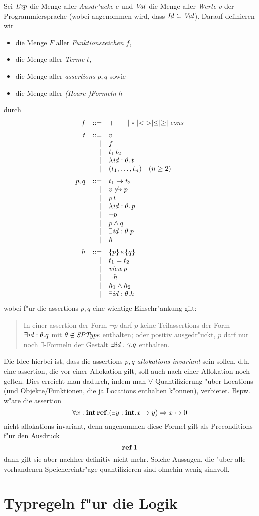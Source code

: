 \documentclass[12pt,a4paper,bigheadings]{scrartcl}
\newcommand{\Sptype}{\name{SPType}}
\renewcommand{\disjoint}[2]{\ensuremath{#2\not\hookrightarrow#1}}
\newcommand{\view}[1]{\ensuremath{\app{\name{view}}{#1}}}
\begin{document}
Sei ${\text{\it Exp\/}}$ die Menge aller {\em Ausdr"ucke} $e$ und ${\text{\it Val\/}}$ die Menge aller {\em Werte} $v$
der Programmiersprache (wobei angenommen wird, dass ${\text{\it Id\/}} \subseteq {\text{\it Val\/}}$). Darauf definieren wir 
\begin{itemize}
  \item die Menge $F$ aller {\em Funktionszeichen} $f$,
  \item die Menge  aller {\em Terme} $t$,
  \item die Menge  aller {\em assertions} $p,q$ sowie
  \item die Menge  aller {\em (Hoare-)Formeln} $h$
\end{itemize}
durch
\[\bgram
f \is + \mid - \mid * \mid < \mid > \mid \le \mid \ge \mid \Cons
  \n
t \is v
  \al f
  \al \app{t_1}{t_2}
  \al \abstr{\id:\theta}{t}
  \al (t_1,\ldots,t_n)  \quad (n \ge 2)
  \n
p,q \is t_1 \mapsto t_2
    \al \disjoint{p}{v}
    \al \app{p}{t}
    \al \abstr{\id:\theta}{p}
    \al \neg p
    \al p \wedge q
    \al \exists \id:\theta. p
    \al h
    \n
h \is \triple{p}{e}{q}
  \al t_1 = t_2
  \al \view{p}
  \al \neg h
  \al h_1 \wedge h_2
  \al \exists \id:\theta. h
\egram\]
wobei f"ur die assertions $p,q$ eine wichtige Einschr"ankung gilt:
\begin{quote}
  In einer assertion der Form $\neg p$ darf $p$ keine Teilassertions der Form
  $\exists {\text{\it id\/}}:\theta.q$ mit $\theta \not\in \Sptype$ enthalten; oder positiv
  ausgedr"uckt, $p$ darf nur noch $\exists$-Formeln der Gestalt $\exists {\text{\it id\/}}:\gamma.q$
  enthalten.
\end{quote}
Die Idee hierbei ist, dass die assertions $p,q$ {\em allokations-invariant} sein
sollen, d.h. eine assertion, die vor einer Allokation gilt, soll auch nach einer
Allokation noch gelten. Dies erreicht man dadurch, indem man $\forall$-Quantifizierung
"uber Locations (und Objekte/Funktionen, die ja Locations enthalten k"onnen), verbietet.
Bspw. w"are die assertion
\[
  \forall x:\textbf{int}\,\mathbf{ref}. (\exists y:\textbf{int}. x \mapsto y) \Rightarrow x \mapsto 0
\]
nicht allokations-invariant, denn angenommen diese Formel gilt als Preconditions
f"ur den Ausdruck
\[
  \mathbf{ref}\,1
\]
dann gilt sie aber nachher definitiv nicht mehr. Solche
Aussagen, die "uber alle vorhandenen Speichereintr"age quantifizieren sind ohnehin
wenig sinnvoll.


\section{Typregeln f"ur die Logik}
\end{document}
